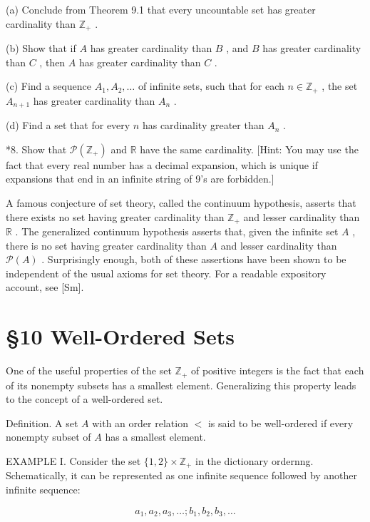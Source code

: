 \documentclass[10pt]{article}
\begin{document}
(a) Conclude from Theorem 9.1 that every uncountable set has greater cardinality than \({\mathbb{Z}}_{ + }\) .

(b) Show that if \(A\) has greater cardinality than \(B\) , and \(B\) has greater cardinality than \(C\) , then \(A\) has greater cardinality than \(C\) .

(c) Find a sequence \({A}_{1},{A}_{2},\ldots\) of infinite sets, such that for each \(n \in  {\mathbb{Z}}_{ + }\) , the set \({A}_{n + 1}\) has greater cardinality than \({A}_{n}\) .

(d) Find a set that for every \(n\) has cardinality greater than \({A}_{n}\) .

*8. Show that \(\mathcal{P}\left( {\mathbb{Z}}_{ + }\right)\) and \(\mathbb{R}\) have the same cardinality. [Hint: You may use the fact that every real number has a decimal expansion, which is unique if expansions that end in an infinite string of 9's are forbidden.]

A famous conjecture of set theory, called the continuum hypothesis, asserts that there exists no set having greater cardinality than \({\mathbb{Z}}_{ + }\) and lesser cardinality than \(\mathbb{R}\) . The generalized continuum hypothesis asserts that, given the infinite set \(A\) , there is no set having greater cardinality than \(A\) and lesser cardinality than \(\mathcal{P}\left( A\right)\) . Surprisingly enough, both of these assertions have been shown to be independent of the usual axioms for set theory. For a readable expository account, see [Sm].

\section*{§10 Well-Ordered Sets}

One of the useful properties of the set \({\mathbb{Z}}_{ + }\) of positive integers is the fact that each of its nonempty subsets has a smallest element. Generalizing this property leads to the concept of a well-ordered set.

Definition. A set \(A\) with an order relation \(<\) is said to be well-ordered if every nonempty subset of \(A\) has a smallest element.

EXAMPLE I. Consider the set \(\{ 1,2\}  \times  {\mathbb{Z}}_{ + }\) in the dictionary ordernng. Schematically, it can be represented as one infinite sequence followed by another infinite sequence:

\[
{a}_{1},{a}_{2},{a}_{3},\ldots ;{b}_{1},{b}_{2},{b}_{3},\ldots
\]
\end{document}

